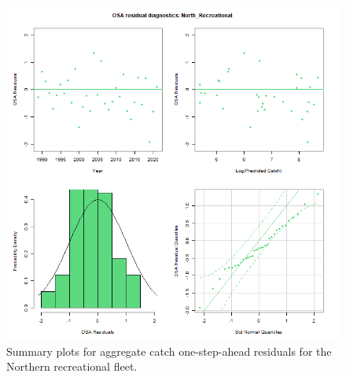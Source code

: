 \documentclass[
]{article}
\begin{document}
\begin{figure}

{\centering \includegraphics[width=1\linewidth]{../2023.RT.Runs/Run34/plots_png/diagnostics/OSA_resid_catch_4panel_North_Recreational} 

}

\caption{Summary plots for aggregate catch one-step-ahead residuals for the Northern recreational fleet.}\label{fig:osa-North-rec-catch-summ}
\end{figure}
\end{document}
